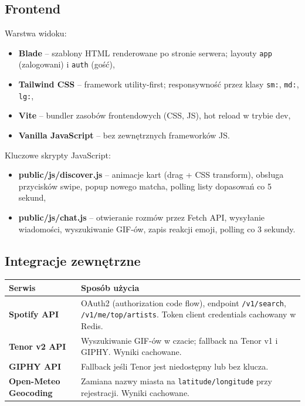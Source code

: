 \documentclass[12pt,a4paper]{article}
\begin{document}
\subsection{Frontend}

Warstwa widoku:
\begin{itemize}
    \item \textbf{Blade} -- szablony HTML renderowane po stronie serwera; layouty \texttt{app} (zalogowani) i \texttt{auth} (gość),
    \item \textbf{Tailwind CSS} -- framework utility-first; responsywność przez klasy \texttt{sm:}, \texttt{md:}, \texttt{lg:},
    \item \textbf{Vite} -- bundler zasobów frontendowych (CSS, JS), hot reload w trybie dev,
    \item \textbf{Vanilla JavaScript} -- bez zewnętrznych frameworków JS.
\end{itemize}

Kluczowe skrypty JavaScript:
\begin{itemize}
    \item \textbf{public/js/discover.js} -- animacje kart (drag + CSS transform), obsługa przycisków swipe, popup nowego matcha, polling listy dopasowań co 5 sekund,
    \item \textbf{public/js/chat.js} -- otwieranie rozmów przez Fetch API, wysyłanie wiadomości, wyszukiwanie GIF-ów, zapis reakcji emoji, polling co 3 sekundy.
\end{itemize}

\subsection{Integracje zewnętrzne}

\begin{longtable}{|p{3.5cm}|p{9.7cm}|}
\hline
\textbf{Serwis} & \textbf{Sposób użycia} \\
\hline
\textbf{Spotify API} & OAuth2 (authorization code flow), endpoint \texttt{/v1/search}, \texttt{/v1/me/top/artists}. Token client credentials cachowany w Redis. \\
\hline
\textbf{Tenor v2 API} & Wyszukiwanie GIF-ów w czacie; fallback na Tenor v1 i GIPHY. Wyniki cachowane. \\
\hline
\textbf{GIPHY API} & Fallback jeśli Tenor jest niedostępny lub bez klucza. \\
\hline
\textbf{Open-Meteo Geocoding} & Zamiana nazwy miasta na \texttt{latitude/longitude} przy rejestracji. Wyniki cachowane. \\
\hline
\end{longtable}
\end{document}
